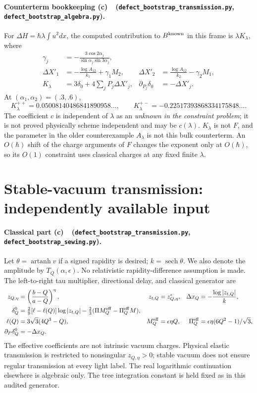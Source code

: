 \documentclass[11pt,a4paper]{article}
\newcommand{\C}{\textbf{(c)}\ }
\newcommand{\file}[1]{\nolinkurl{#1}}
\newcommand{\alg}{\file{defect_bootstrap_algebra.py}}
\newcommand{\tra}{\file{defect_bootstrap_transmission.py}}
\newcommand{\sew}{\file{defect_bootstrap_sewing.py}}
\begin{document}
\paragraph{Counterterm bookkeeping \C\ (\tra, \alg).}
For $\Delta H=\hbar\lambda\int u^2dx$, the computed contribution
to $B^{\rm known}$ in this frame is $\lambda K_\lambda$, where
\begin{align}
 \gamma_j&=-\frac{3\cos2\alpha_j}{\sin\alpha_j\sin3\alpha_j},\nonumber\\
 \Delta X'_1&=-\frac{\log A_{12}}{k_1}+\gamma_1M_2,
 &\Delta X'_2&=\frac{\log A_{12}}{k_2}-\gamma_2M_1,\nonumber\\
 K_\lambda&=3\delta_0+4\sum_jP_j\Delta X'_j,
 &\partial_{P_j}\delta_0&=-\Delta X'_j.\label{K}
\end{align}
At $(\alpha_1,\alpha_2)=(.3,.6)$,
\[K_\lambda^{++}=0.05008140486841890958\ldots,\qquad
K_\lambda^{+-}=-0.22517393868334175848\ldots.\]
The coefficient $c$ is independent of $\lambda$ as an \emph{unknown in the
constraint problem}; it is not proved physically scheme independent and
may be $c(\lambda)$. $K_\lambda$ is not $F$, and the parameter in the older
counterexample $A_\lambda$ is not this bulk counterterm.
An $O(\hbar)$ shift of the charge arguments of $F$ changes the exponent only
at $O(\hbar)$, so its $O(1)$ constraint uses classical charges at any fixed
finite $\lambda$.

\section{Stable-vacuum transmission: independently available input}
\paragraph{Classical part \C\ (\tra, \sew).}
Let $\theta=\operatorname{artanh}v$ if a signed rapidity is desired;
$k=\operatorname{sech}\theta$. We also denote the amplitude by
$T_Q(\alpha,\epsilon)$. No relativistic rapidity-difference assumption is made.
The left-to-right tau multiplier, directional delay, and classical generator are
\begin{align}
 z_{Q,\eta}&=\left(\frac{b-Q}{a-Q}\right)^\eta,&
 z_{t,Q}&=z_{Q,\eta}^{\epsilon},&
 \Delta x_Q&=-\frac{\log|z_{t,Q}|}{k},\label{z}\\
 \delta_Q^0&=\tfrac29[\ell-\ell(Q)]\log|z_{t,Q}|
                  -\tfrac23(\Pi M_Q^{\rm eff}-\Pi_Q^{\rm eff}M),\label{deltaD}\\
 \ell(Q)&=3\sqrt3(4Q^3-Q),&
 M_Q^{\rm eff}&=\epsilon\eta Q,&
 \Pi_Q^{\rm eff}&=\epsilon\eta(6Q^2-1)/\sqrt3,\nonumber\\
 \partial_P\delta_Q^0&=-\Delta x_Q.\label{deltagrad}
\end{align}
The effective coefficients are not intrinsic vacuum charges. Physical elastic
transmission is restricted to nonsingular $z_{Q,\eta}>0$; stable vacuum does
not ensure regular transmission at every light label. The real logarithmic
continuation elsewhere is algebraic only. The tree integration constant is
held fixed as in this audited generator.
\end{document}
